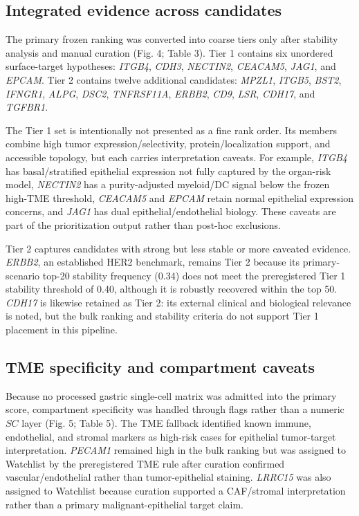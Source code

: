 \documentclass[twocolumn]{article}
\begin{document}
\subsection{Integrated evidence across candidates}

The primary frozen ranking was converted into coarse tiers only after stability analysis and manual curation (Fig. 4; Table 3). Tier 1 contains six unordered surface-target hypotheses: \textit{ITGB4}, \textit{CDH3}, \textit{NECTIN2}, \textit{CEACAM5}, \textit{JAG1}, and \textit{EPCAM}. Tier 2 contains twelve additional candidates: \textit{MPZL1}, \textit{ITGB5}, \textit{BST2}, \textit{IFNGR1}, \textit{ALPG}, \textit{DSC2}, \textit{TNFRSF11A}, \textit{ERBB2}, \textit{CD9}, \textit{LSR}, \textit{CDH17}, and \textit{TGFBR1}.

The Tier 1 set is intentionally not presented as a fine rank order. Its members combine high tumor expression/\allowbreak{}selectivity, protein/\allowbreak{}localization support, and accessible topology, but each carries interpretation caveats. For example, \textit{ITGB4} has basal/\allowbreak{}stratified epithelial expression not fully captured by the organ-risk model, \textit{NECTIN2} has a purity-adjusted myeloid/\allowbreak{}DC signal below the frozen high-TME threshold, \textit{CEACAM5} and \textit{EPCAM} retain normal epithelial expression concerns, and \textit{JAG1} has dual epithelial/\allowbreak{}endothelial biology. These caveats are part of the prioritization output rather than post-hoc exclusions.

Tier 2 captures candidates with strong but less stable or more caveated evidence. \textit{ERBB2}, an established HER2 benchmark, remains Tier 2 because its primary-scenario top-20 stability frequency (0.34) does not meet the preregistered Tier 1 stability threshold of 0.40, although it is robustly recovered within the top 50. \textit{CDH17} is likewise retained as Tier 2: its external clinical and biological relevance is noted, but the bulk ranking and stability criteria do not support Tier 1 placement in this pipeline.

\subsection{TME specificity and compartment caveats}

Because no processed gastric single-cell matrix was admitted into the primary score, compartment specificity was handled through flags rather than a numeric $SC$ layer (Fig. 5; Table 5). The TME fallback identified known immune, endothelial, and stromal markers as high-risk cases for epithelial tumor-target interpretation. \textit{PECAM1} remained high in the bulk ranking but was assigned to Watchlist by the preregistered TME rule after curation confirmed vascular/\allowbreak{}endothelial rather than tumor-epithelial staining. \textit{LRRC15} was also assigned to Watchlist because curation supported a CAF/\allowbreak{}stromal interpretation rather than a primary malignant-epithelial target claim.
\end{document}
